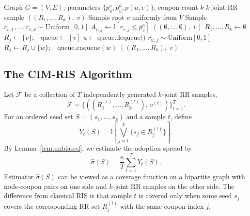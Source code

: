 \documentclass[sigconf]{acmart}
\newcommand{\CIMRIS}{\textsc{CIM-RIS}}
\newcommand{\I}{\mathbb{I}}
\begin{document}
\begin{algorithm}[t]
\caption{$k$-Joint RR Sample Generation}
\label{alg:rrset}
\begin{algorithmic}[1]
\Require Graph $G=(V,E)$; parameters $\{p_u^a, p_u^d, p(u,v)\}$;
  coupon count $k$
\Ensure $k$-joint RR sample $((R_1,\ldots,R_k),\; v)$
\State Sample root $v$ uniformly from $V$
\State Sample $r_{v,1},\ldots,r_{v,k} \sim \mathrm{Uniform}[0,1]$
  \State $A_{v,j} \gets \I[r_{v,j} \leq p_v^a]$
\EndFor
{}
  \State \Return $((\emptyset,\ldots,\emptyset),\; v)$
\EndIf
\State $R_1, \ldots, R_k \gets \emptyset$
    \State $R_j \gets \{v\}$;\ \ $\text{queue} \gets [v]$
      \State $u \gets \text{queue.dequeue()}$
          \State $r_{w,j} \sim \mathrm{Uniform}[0,1]$
        \EndIf
          \State $R_j \gets R_j \cup \{w\}$;\ \
            $\text{queue.enqueue}(w)$
        \EndIf
      \EndFor
    \EndWhile
  \EndIf
\EndFor
\State \Return $((R_1, \ldots, R_k),\; v)$
\end{algorithmic}
\end{algorithm}

\subsection{The \CIMRIS{} Algorithm}

Let $\mathcal{F}$ be a collection of $T$ independently generated
$k$-joint RR samples,
\[
  \mathcal{F} =
  \{((R_1^{(t)},\ldots,R_k^{(t)}),\, v^{(t)})\}_{t=1}^T .
\]
For an ordered seed set $S=(s_1,\ldots,s_k)$ and a sample $t$, define
\[
  Y_t(S)=
  \I\!\left[\bigvee_{j=1}^{k} \{s_j \in R_j^{(t)}\}\right].
\]
By Lemma~\ref{lem:unbiased}, we estimate the adoption spread by
\[
  \hat{\sigma}(S) = \frac{n}{T}\sum_{t=1}^{T}
    Y_t(S).
\]
Estimator $\hat{\sigma}(S)$ can be viewed as a coverage function on a
bipartite graph with node-coupon pairs on one side and $k$-joint RR
samples on the other side.
The difference from classical RIS is that sample $t$ is covered only
when some seed $s_j$ covers the corresponding RR set $R_j^{(t)}$ with
the same coupon index $j$.
\end{document}

